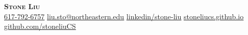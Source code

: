 \begin{center}
	\textbf{\Huge \scshape Stone Liu} \\ \vspace{0.25pt}
	\uline{617-792-6757} \quad
	\href{mailto:liu.sto@northeastern.edu}{\uline{liu.sto@northeastern.edu}} \quad
	\href{http://linkedin.com/in/stone-liu}{\uline{linkedin/stone-liu}} \quad
	\href{https://stoneliucs.github.io/}{\uline{stoneliucs.github.io}} \quad
	\href{https://github.com/stoneliuCS}{\uline{github.com/stoneliuCS}}
\end{center}
